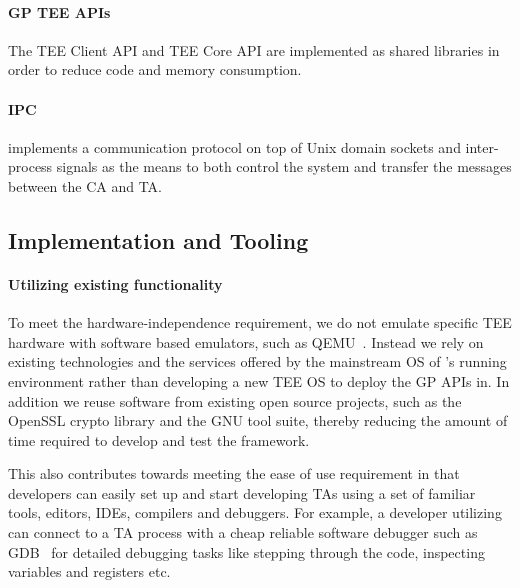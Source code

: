 \documentclass[10pt,conference,letterpaper]{IEEEtran}
\newcommand{\opentee}{\protect{TEE-Vi}\xspace}
\newcommand{\opentee}{\protect{Open-TEE}\xspace}
\begin{document}
\paragraph{GP TEE APIs}
The TEE Client API and TEE Core API are implemented as shared libraries in order to reduce code and memory consumption. 


\paragraph{IPC}
\opentee implements a communication protocol on top of Unix domain sockets and inter-process signals as the means to both control the system and transfer the messages between the CA and TA.


\subsection{Implementation and Tooling}
\label{subsec:implementation}
\paragraph{Utilizing existing functionality} To meet the hardware-independence requirement, we do not emulate specific TEE hardware with software based emulators, such as QEMU~\cite{web:QEMU}. Instead we rely on existing technologies and the services offered by the mainstream OS of \opentee's running environment rather than developing a new TEE OS to deploy the GP APIs in.  In addition we reuse software from existing open source projects, such as the OpenSSL crypto library and the GNU tool suite, thereby reducing the amount of time required to develop and test the \opentee framework.

This also contributes towards meeting the ease of use requirement in that developers can easily set up \opentee and start developing TAs using a set of familiar tools, editors, IDEs, compilers and debuggers. For example, a developer utilizing \opentee can connect to a TA process with a cheap reliable software debugger such as GDB~\cite{web:GNU_GDB} for detailed debugging tasks like stepping through the code, inspecting variables and registers etc.
\end{document}
